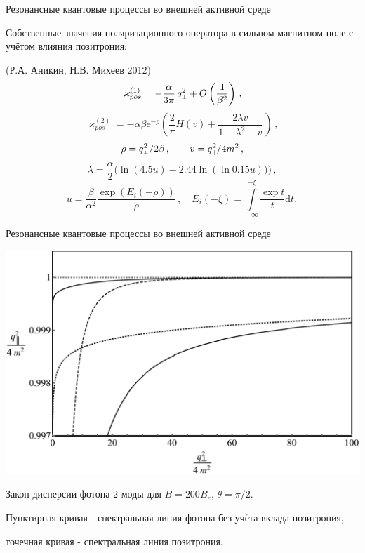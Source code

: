 \documentclass{beamer}
\def\mprp{\mbox{\tiny $\bot$}}
\def\mprl{\mbox{\tiny $\|$}}
\newcommand{\dd}{\mathrm{d}}
\newcommand{\eee}{\mathrm{e}}
\begin{document}
\begin{frame}{Резонансные квантовые процессы во внешней активной среде}
\begin{center}
Собственные значения поляризационного оператора в сильном магнитном поле с учётом влияния позитрония:

(Р.А. Аникин, Н.В. Михеев 2012)
$$\varkappa_{pos}^{(1)} = - \frac{\alpha}{3\pi} \, 
q^2_{\mprp} + O \left (\frac{1}{\beta^2} \right)  \, ,$$
\alert{$$\varkappa_{pos}^{(2)} = - \alpha \beta \eee^{-\rho} \left (\frac{2}{\pi} H (v)
+ \frac{2\lambda v}{1 - \lambda^2 - v}\, \right )\, ,$$}
$$\rho = q^2_{\mprp} / 2\beta\, ,\qquad v = q^2_{\mprl} / 4m^2\, ,$$
$$\lambda = \frac{\alpha}{2} \big (\ln (4.5 u) -2.44 \ln (\ln 0.15 u)) \big )\,,$$
$$u = \frac{\beta}{\alpha^2} \frac{\exp (E_i (-\rho))}{\rho} \,,\quad E_i (-\xi) = \int\limits_{-\infty}^{-\xi} \frac{\exp t}{t} \dd t,$$
\end{center}
\end{frame}
\begin{frame}{Резонансные квантовые процессы во внешней активной среде}
\begin{center}
\includegraphics[scale=0.35]{Disp200.pdf}

Закон дисперсии фотона 2 моды для $B = 200B_e$, $\theta = \pi/2$.

Пунктирная кривая -  спектральная линия фотона без учёта вклада позитрония,

точечная кривая - спектральная линия позитрония.
\end{center}
\end{frame}
\end{document}
